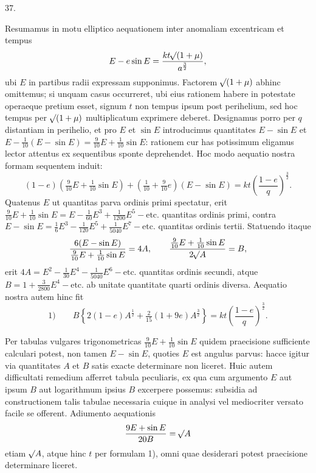 \begin{center}
37.
\end{center}
Resumamus in motu elliptico aequationem inter anomaliam excentricam et tempus
\[
E-e\sin E=\frac{kt\mathord{{}^{}\!\surd}(1+\mu)}{a^{\frac{3}{2}}},
\]
ubi $E$ in partibus radii expressam supponimus. Factorem $\mathord{{}^{}\!\surd}(1+\mu)$ abhinc omittemus; si unquam casus occurreret, ubi eius rationem habere in potestate operaeque pretium esset, signum $t$ non tempus ipsum post perihelium, sed hoc tempus per $\mathord{{}^{}\!\surd}(1+\mu)$ multiplicatum exprimere deberet. Designamus porro per $q$ distantiam in perihelio, et pro $E$ et $\sin E$ introducimus quantitates $E-\sin E$ et $E-\tfrac{1}{10}(E-\sin E)=\tfrac{9}{10}E+\tfrac{1}{10}\sin E$: rationem cur has potissimum eligamus lector attentus ex sequentibus sponte deprehendet. Hoc modo aequatio nostra formam sequentem induit:
\[
(1-e)(\tfrac{9}{10}E+\tfrac{1}{10}\sin E)+(\tfrac{1}{10}+\tfrac{9}{10}e)(E-\sin E)=kt\left(\frac{1-e}{q}\right)^{\frac{3}{2}}.
\]
Quatenus $E$ ut quantitas parva ordinis primi spectatur, erit $\tfrac{9}{10}E+\tfrac{1}{10}\sin E=E-\tfrac{1}{60}E^3+\tfrac{1}{1200}E^5-\text{etc.}$ quantitas ordinis primi, contra $E-\sin E=\tfrac{1}{6} E^3-\tfrac{1}{120}E^5+\tfrac{1}{5040}E^7-\text{etc.}$ quantitas ordinis tertii. Statuendo itaque
\[
\frac{6(E-\sin E)}{\frac{9}{10}E+\frac{1}{10}\sin E}=4A,\qquad
\frac{\frac{9}{10}E+\frac{1}{10}\sin E}{2\mathord{{}^{}\!\surd}A}=B,
\]
erit $4A=E^2-\tfrac{1}{30}E^4-\tfrac{1}{5040}E^6-\text{etc.}$ quantitas ordinis secundi, atque $B=1+\tfrac{3}{2800}E^4-\text{etc.}$ ab unitate quantitate quarti ordinis diversa. Aequatio nostra autem hinc fit
\[
\text{1)}\qquad B\left\{2(1-e)A^{\frac{1}{2}}+\tfrac{2}{15}(1+9e)A^{\frac{3}{2}}\right\}=kt\left(\frac{1-e}{q}\right)^{\frac{3}{2}}.
\]

Per tabulas vulgares trigonometricas $\tfrac{9}{10}E+\tfrac{1}{10}\sin E$ quidem praecisione sufficiente calculari potest, non tamen $E-\sin E$, quoties $E$ est angulus parvus: hacce igitur via quantitates $A$ et $B$ satis exacte determinare non liceret. Huic autem difficultati remedium afferret tabula peculiaris, ex qua cum argumento $E$ aut ipsum $B$ aut logarithmum ipsius $B$ excerpere possemus: subsidia ad constructionem talis tabulae necessaria cuique in analysi vel mediocriter versato facile se offerent. Adiumento aequationis
\[
\frac{9E+\sin E}{20B}=\mathord{{}^{}\!\surd}A
\]
etiam $\mathord{{}^{}\!\surd}A$, atque hinc $t$ per formulam 1), omni quae desiderari potest praecisione determinare liceret.

